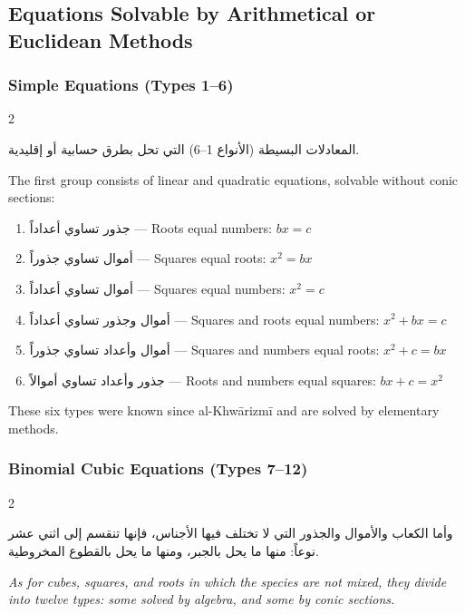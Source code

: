 \documentclass[11pt,a4paper]{book}
\begin{document}
\subsection{Equations Solvable by Arithmetical or Euclidean Methods}
\label{subsec:simple}

\subsubsection{Simple Equations (Types 1--6)}
\label{subsubsec:simple-eqs}

\begin{paracol}{2}

\begin{Arabic}
المعادلات البسيطة (الأنواع 1–6) التي تحل بطرق حسابية أو إقليدية.
\end{Arabic}

\switchcolumn

The first group consists of linear and quadratic equations, solvable without conic sections:

\end{paracol}

\begin{enumerate}[label=\arabic*.,noitemsep]
\item \textarabic{جذور تساوي أعداداً} --- Roots equal numbers: $bx = c$
\item \textarabic{أموال تساوي جذوراً} --- Squares equal roots: $x^2 = bx$
\item \textarabic{أموال تساوي أعداداً} --- Squares equal numbers: $x^2 = c$
\item \textarabic{أموال وجذور تساوي أعداداً} --- Squares and roots equal numbers: $x^2 + bx = c$
\item \textarabic{أموال وأعداد تساوي جذوراً} --- Squares and numbers equal roots: $x^2 + c = bx$
\item \textarabic{جذور وأعداد تساوي أموالاً} --- Roots and numbers equal squares: $bx + c = x^2$
\end{enumerate}

These six types were known since al-Khwārizmī and are solved by elementary methods.

\subsubsection{Binomial Cubic Equations (Types 7--12)}
\label{subsubsec:binomial}

\begin{paracol}{2}

\begin{Arabic}
وأما الكعاب والأموال والجذور التي لا تختلف فيها الأجناس، فإنها تنقسم إلى اثني عشر نوعاً: منها ما يحل بالجبر، ومنها ما يحل بالقطوع المخروطية.
\end{Arabic}

\switchcolumn

\textit{As for cubes, squares, and roots in which the species are not mixed, they divide into twelve types: some solved by algebra, and some by conic sections.}

\end{paracol}
\end{document}
